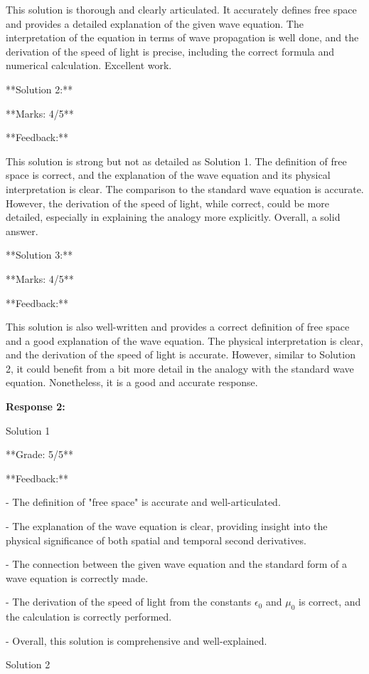 \documentclass[a4paper,11pt]{article}
\begin{document}
This solution is thorough and clearly articulated. It accurately defines free space and provides a detailed explanation of the given wave equation. The interpretation of the equation in terms of wave propagation is well done, and the derivation of the speed of light is precise, including the correct formula and numerical calculation. Excellent work.

**Solution 2:**

**Marks: 4/5**

**Feedback:**

This solution is strong but not as detailed as Solution 1. The definition of free space is correct, and the explanation of the wave equation and its physical interpretation is clear. The comparison to the standard wave equation is accurate. However, the derivation of the speed of light, while correct, could be more detailed, especially in explaining the analogy more explicitly. Overall, a solid answer.

**Solution 3:**

**Marks: 4/5**

**Feedback:**

This solution is also well-written and provides a correct definition of free space and a good explanation of the wave equation. The physical interpretation is clear, and the derivation of the speed of light is accurate. However, similar to Solution 2, it could benefit from a bit more detail in the analogy with the standard wave equation. Nonetheless, it is a good and accurate response.

\bigskip
\textbf{Response 2:}

Solution 1

**Grade: 5/5**

**Feedback:**

- The definition of "free space" is accurate and well-articulated.

- The explanation of the wave equation is clear, providing insight into the physical significance of both spatial and temporal second derivatives.

- The connection between the given wave equation and the standard form of a wave equation is correctly made.

- The derivation of the speed of light from the constants \(\epsilon_{0}\) and \(\mu_{0}\) is correct, and the calculation is correctly performed.

- Overall, this solution is comprehensive and well-explained.

Solution 2
\end{document}
